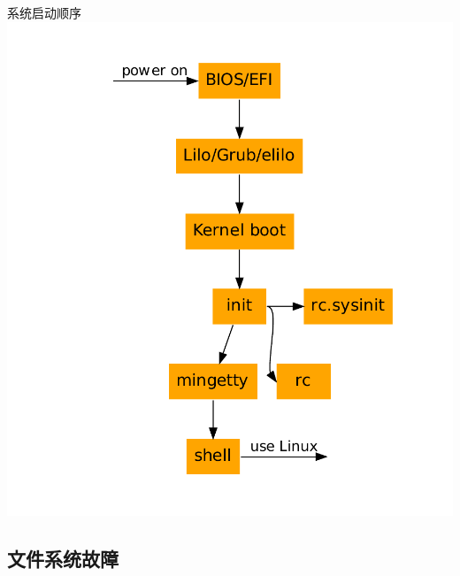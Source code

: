 \begin{frame}{系统启动顺序}
\center
\includegraphics[height=.8\textheight]{images/boot.pdf}

\end{frame}


\subsection{文件系统故障}



